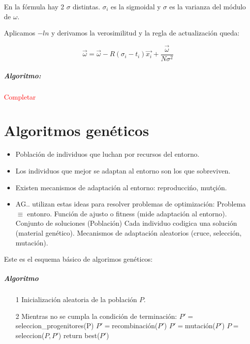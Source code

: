 \documentclass{apuntes}
\begin{document}
\obs En la fórmula hay 2 $σ$ distintas. $σ_i$ es la sigmoidal y $σ$ es la varianza del módulo de $ω$.



Aplicamos $-ln$ y derivamos la verosimilitud y la regla de actualización queda:

\[
\vec{ω} = \vec{ω} - R\left(σ_i - t_i\right)\vec{x_i} + \frac{\vec{ω}}{Nσ^2}
\]

\paragraph{Algoritmo:}

\textcolor{red}{Completar}

\chapter{Algoritmos genéticos}

\begin{itemize}
	\item
Población de individuos que luchan por recursos del entorno.
\item Los individuos que mejor se adaptan al entorno son los que sobreviven.
\item Existen mecanismos de adaptación al entorno: reproduccińo, mutçión.
\item AG.. utilizan estas ideas para resolver problemas de optimización:
\subitem Problema $\equiv$ entonro.
\subitem Función de ajusto o fitness (mide adaptación al entorno).
\subitem Conjunto de soluciones (Población)
\subitem Cada individuo codigica una solución (material genético).
\subitem Mecanismos de adaptación aleatorios (cruce, selección, mutación).
\end{itemize}

Este es el esquema básico de algorimos genéticos:

\paragraph{Algoritmo}
\begin{itemize}
	\item[1] Inicialización aleatoria de la población $P$.
	\item[2] Mientras no se cumpla la condición de terminación:
	\subitem $P'=$seleccion\_progenitores(P)
	\subitem $P'=$recombinación($P'$)
	\subitem $P'=$mutación($P'$)
	\subitem $P=$seleccion($P,P'$)
	return best($P'$)
\end{itemize}
\end{document}
